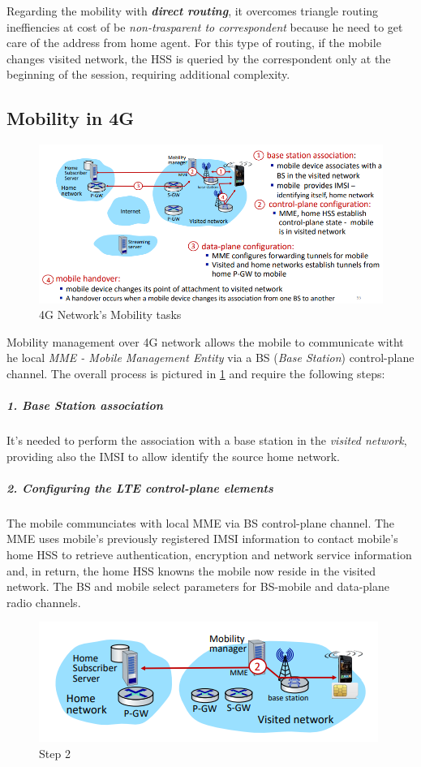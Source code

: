 \documentclass[10pt,a4paper]{report}
\theoremstyle{definition}
\begin{document}
Regarding the mobility with \textit{\textbf{direct routing}}, it overcomes triangle routing ineffiencies at cost of be \textit{non-trasparent to correspondent} because he need to get care of the address from home agent. For this type of routing, if the mobile changes visited network, the HSS is queried by the correspondent only at the beginning of the session, requiring additional complexity.
\subsection{Mobility in 4G}\label{sec:mobility-in-4g}
\begin{figure}[h]
	\centering\includegraphics[scale=0.50]{images/Pasted image 20230322120159.png}
	\caption{4G Network's Mobility tasks}
\label{4g-mobility-process}
\end{figure}


Mobility management over 4G network allows the mobile to communicate witht he local \textit{MME - Mobile Management Entity} via a BS (\textit{Base Station}) control-plane channel. The overall process is pictured in \ref{4g-mobility-process} and require the following steps:

\subparagraph{1. Base Station association}
It's needed to perform the association with a base station in the \textit{visited network}, providing also the IMSI to allow identify the source home network.
\subparagraph{2. Configuring the LTE control-plane elements}
The mobile communciates with local MME via BS control-plane channel. The MME uses mobile's previously registered IMSI information to contact mobile's home HSS to retrieve authentication, encryption and network service information and, in return, the home HSS knowns the mobile now reside in the visited network. The BS and mobile select parameters for BS-mobile and data-plane radio channels.

\begin{figure}[h]
	\centering\includegraphics[scale=0.70]{images/Pasted image 20230322120641.png}
	\caption{Step 2}
\end{figure}
\end{document}
